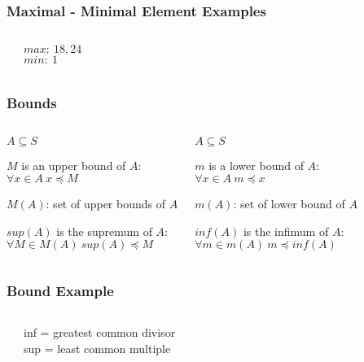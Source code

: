 \documentclass[dvipsnames]{beamer}
\begin{document}
\begin{frame}
  \frametitle{Maximal - Minimal Element Examples}

  \begin{example}
    \begin{columns}
      \begin{center}
      \end{center}

      $max:~18,24$\\
      $min:~1$
    \end{columns}
  \end{example}
\end{frame}

\begin{frame}
  \frametitle{Bounds}

  \begin{columns}[t]
    \begin{definition}
      $A \subseteq S$

      \medskip
      $M$ is an \alert{upper bound} of $A$:\\
      $\forall x \in A~x \preceq M$

      \bigskip
      $M(A)$: set of upper bounds of $A$

      \medskip
      $sup(A)$ is the \alert{supremum} of $A$:\\
      $\forall M \in M(A)~sup(A) \preceq M$
    \end{definition}

    \pause
    \begin{definition}
      $A \subseteq S$

      \medskip
      $m$ is a \alert{lower bound} of $A$:\\
      $\forall x \in A~m \preceq x$

      \bigskip
      $m(A)$: set of lower bound of $A$

      \medskip
      $inf(A)$ is the \alert{infimum} of $A$:\\
      $\forall m \in m(A)~m \preceq inf(A)$
    \end{definition}
  \end{columns}
\end{frame}

\begin{frame}
  \frametitle{Bound Example}

  \begin{example}[factors of 36]
    \begin{columns}
      \begin{center}
      \end{center}

      inf = greatest common divisor\\
      sup = least common multiple
    \end{columns}
  \end{example}
\end{frame}
\end{document}
